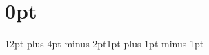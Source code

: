 \usepackage{cmap}               %
\usepackage[T1]{fontenc}        %
\usepackage[utf8]{inputenc}     %

\usepackage{csquotes}
\usepackage{blindtext}


\newcommand{\docDeadline}{Submission Date}
\newcommand{\docKeywords}{These, Are, Your, Keywords}

\newcommand{\uniTitle}{Your University}
\newcommand{\uniPostalCode}{12345}
\newcommand{\uniCity}{Fantasy City}
\newcommand{\uniStreet}{Fantasy Street 123}

\newcommand{\docAuthors}{John Doe, Jane Doe, Catherine Parr}


\usepackage[
    paper=a4paper,
    inner=1cm,
    outer=1cm,
    top=1cm,
    bottom=1.5cm,
]{geometry}

\usepackage{multicol}


\usepackage{titlesec}

\titlespacing\section{0pt}{12pt plus 4pt minus 2pt}{1pt plus 1pt minus 1pt}

